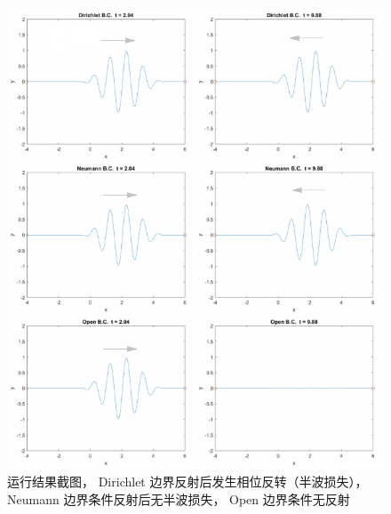 \begin{figure}[ht]
\centering
\includegraphics[width=16cm]{./figures/W1dNum_1.png}
\caption{运行结果截图， Dirichlet 边界反射后发生相位反转（半波损失）， Neumann 边界条件反射后无半波损失， Open 边界条件无反射} \label{W1dNum_fig1}
\end{figure}
